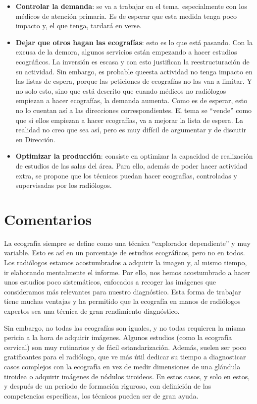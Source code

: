 \documentclass[]{article}
\providecommand{\tightlist}{%
  \setlength{\itemsep}{0pt}\setlength{\parskip}{0pt}}
\begin{document}
\begin{itemize}
\tightlist
\item
  \textbf{Controlar la demanda}: se va a trabajar en el tema, especialmente con los médicos de atención primaria. Es de esperar que esta medida tenga poco impacto y, el que tenga, tardará en verse.
\item
  \textbf{Dejar que otros hagan las ecografías}: esto es lo que está pasando. Con la excusa de la demora, algunos servicios están empezando a hacer estudios ecográficos. La inversión es escasa y con esto justifican la reestructuración de su actividad. Sin embargo, es probable queesta actividad no tenga impacto en las listas de espera, porque las peticiones de ecografías no las van a limitar. Y no solo esto, sino que está descrito que cuando médicos no radiólogos empiezan a hacer ecografías, la demanda aumenta. Como es de esperar, esto no lo cuentan así a las direcciones correspondientes. El tema se ``vende'' como que si ellos empiezan a hacer ecografías, va a mejorar la lista de espera. La realidad no creo que sea así, pero es muy difícil de argumentar y de discutir en Dirección.
\item
  \textbf{Optimizar la producción}: consiste en optimizar la capacidad de realización de estudios de las salas del área. Para ello, además de poder hacer actividad extra, se propone que los técnicos puedan hacer ecografías, controladas y supervisadas por los radiólogos.
\end{itemize}

\hypertarget{comentarios}{%
\section{Comentarios}\label{comentarios}}

La ecografía siempre se define como una técnica ``explorador dependiente'' y muy variable. Esto es así en un porcentaje de estudios ecográficos, pero no en todos. Los radiólogos estamos acostumbrados a adquirir la imagen y, al mismo tiempo, ir elaborando mentalmente el informe. Por ello, nos hemos acostumbrado a hacer unos estudios poco sistemáticos, enfocados a recoger las imágenes que consideramos más relevantes para nuestro diagnóstico. Esta forma de trabajar tiene muchas ventajas y ha permitido que la ecografía en manos de radiólogos expertos sea una técnica de gran rendimiento diagnóstico.

Sin embargo, no todas las ecografías son iguales, y no todas requieren la misma pericia a la hora de adquirir imágenes. Algunos estudios (como la ecografía cervical) son muy rutinarios y de fácil estandarización. Además, suelen ser poco gratificantes para el radiólogo, que ve más útil dedicar su tiempo a diagnosticar casos complejos con la ecografía en vez de medir dimensiones de una glándula tiroidea o adquirir imágenes de nódulos tiroideos. En estos casos, y solo en estos, y después de un periodo de formación riguroso, con definición de las competencias específicas, los técnicos pueden ser de gran ayuda.
\end{document}
